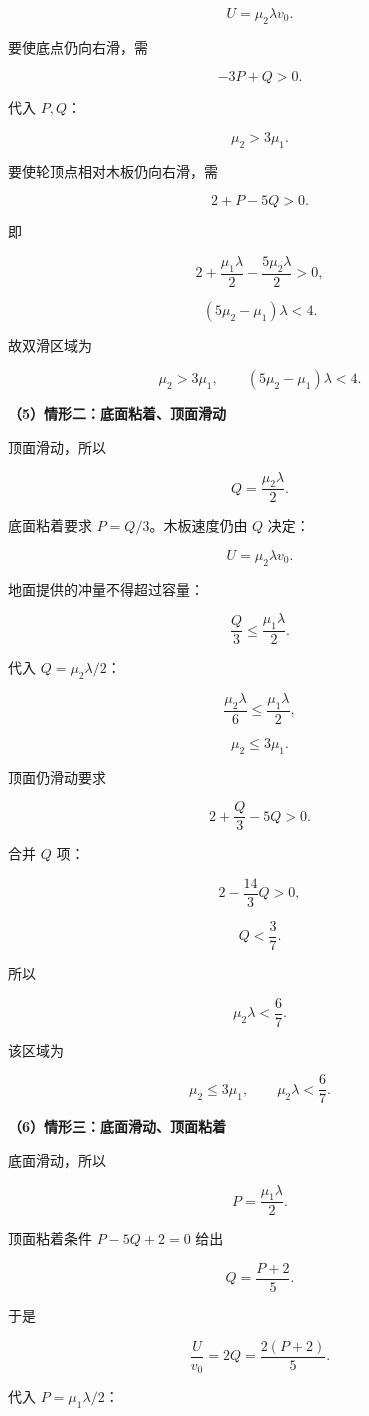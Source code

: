 \documentclass[12pt,a4paper,UTF8]{ctexart}
\begin{document}
\[\boxed{U=\mu_2\lambda v_0}.\]

要使底点仍向右滑，需

\[-3P+Q>0.\]

代入 \(P,Q\)：

\[\mu_2>3\mu_1.\]

要使轮顶点相对木板仍向右滑，需

\[2+P-5Q>0.\]

即

\[2+\frac{\mu_1\lambda}{2}-\frac{5\mu_2\lambda}{2}>0,\]

\[\boxed{(5\mu_2-\mu_1)\lambda<4}.\]

故双滑区域为

\[\boxed{
\mu_2>3\mu_1,
\qquad
(5\mu_2-\mu_1)\lambda<4
}.\]

\textbf{（5）情形二：底面粘着、顶面滑动}

顶面滑动，所以

\[Q=\frac{\mu_2\lambda}{2}.\]

底面粘着要求 \(P=Q/3\)。木板速度仍由 \(Q\) 决定：

\[\boxed{U=\mu_2\lambda v_0}.\]

地面提供的冲量不得超过容量：

\[\frac Q3\le\frac{\mu_1\lambda}{2}.\]

代入 \(Q=\mu_2\lambda/2\)：

\[\frac{\mu_2\lambda}{6}\le\frac{\mu_1\lambda}{2},\]

\[\boxed{\mu_2\le3\mu_1}.\]

顶面仍滑动要求

\[2+\frac Q3-5Q>0.\]

合并 \(Q\) 项：

\[2-\frac{14}{3}Q>0,\]

\[Q<\frac37.\]

所以

\[\boxed{\mu_2\lambda<\frac67}.\]

该区域为

\[\boxed{
\mu_2\le3\mu_1,
\qquad
\mu_2\lambda<\frac67
}.\]

\textbf{（6）情形三：底面滑动、顶面粘着}

底面滑动，所以

\[P=\frac{\mu_1\lambda}{2}.\]

顶面粘着条件 \(P-5Q+2=0\) 给出

\[Q=\frac{P+2}{5}.\]

于是

\[\frac U{v_0}=2Q=\frac{2(P+2)}5.\]

代入 \(P=\mu_1\lambda/2\)：
\end{document}
